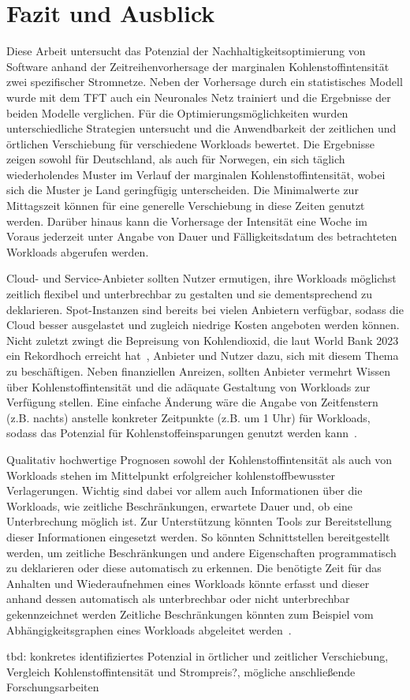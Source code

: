 \chapter{Fazit und Ausblick}
Diese Arbeit untersucht das Potenzial der Nachhaltigkeitsoptimierung von Software anhand der Zeitreihenvorhersage der marginalen Kohlenstoffintensität zwei spezifischer Stromnetze.
Neben der Vorhersage durch ein statistisches Modell wurde mit dem \ac{TFT} auch ein Neuronales Netz trainiert und die Ergebnisse der beiden Modelle verglichen.
Für die Optimierungsmöglichkeiten wurden unterschiedliche Strategien untersucht und die Anwendbarkeit der zeitlichen und örtlichen Verschiebung für verschiedene Workloads bewertet.
Die Ergebnisse zeigen sowohl für Deutschland, als auch für Norwegen, ein sich täglich wiederholendes Muster im Verlauf der marginalen Kohlenstoffintensität, wobei sich die Muster je Land geringfügig unterscheiden.
Die Minimalwerte zur Mittagszeit können für eine generelle Verschiebung in diese Zeiten genutzt werden.
Darüber hinaus kann die Vorhersage der Intensität eine Woche im Voraus jederzeit unter Angabe von Dauer und Fälligkeitsdatum des betrachteten Workloads abgerufen werden.

Cloud- und Service-Anbieter sollten Nutzer ermutigen, ihre Workloads möglichst zeitlich flexibel und unterbrechbar zu gestalten und sie dementsprechend zu deklarieren.
Spot-Instanzen sind bereits bei vielen Anbietern verfügbar, sodass die Cloud besser ausgelastet und zugleich niedrige Kosten angeboten werden können.
Nicht zuletzt zwingt die Bepreisung von Kohlendioxid, die laut World Bank 2023 ein Rekordhoch erreicht hat~\cite{WorldBank.2023}, Anbieter und Nutzer dazu, sich mit diesem Thema zu beschäftigen.
Neben finanziellen Anreizen, sollten Anbieter vermehrt Wissen über Kohlenstoffintensität und die adäquate Gestaltung von Workloads zur Verfügung stellen.
Eine einfache Änderung wäre die Angabe von Zeitfenstern (z.B. nachts) anstelle konkreter Zeitpunkte (z.B. um 1 Uhr) für Workloads, sodass das Potenzial für Kohlenstoffeinsparungen genutzt werden kann~\cite{Wiesner.2021}.

Qualitativ hochwertige Prognosen sowohl der Kohlenstoffintensität als auch von Workloads stehen im Mittelpunkt erfolgreicher kohlenstoffbewusster Verlagerungen.
Wichtig sind dabei vor allem auch Informationen über die Workloads, wie zeitliche Beschränkungen, erwartete Dauer und, ob eine Unterbrechung möglich ist.
Zur Unterstützung könnten Tools zur Bereitstellung dieser Informationen eingesetzt werden.
So könnten Schnittstellen bereitgestellt werden, um zeitliche Beschränkungen und andere Eigenschaften programmatisch zu deklarieren oder diese automatisch zu erkennen.
Die benötigte Zeit für das Anhalten und Wiederaufnehmen eines Workloads könnte erfasst und dieser anhand dessen automatisch als unterbrechbar oder nicht unterbrechbar gekennzeichnet werden
Zeitliche Beschränkungen könnten zum Beispiel vom Abhängigkeitsgraphen eines Workloads abgeleitet werden~\cite{Wiesner.2021}.

tbd: konkretes identifiziertes Potenzial in örtlicher und zeitlicher Verschiebung, Vergleich Kohlenstoffintensität und Strompreis?, mögliche anschließende Forschungsarbeiten


